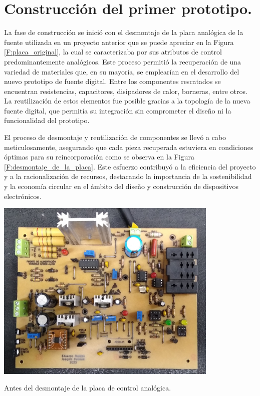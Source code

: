 \section{Construcción del primer prototipo.}
La fase de construcción se inició con el desmontaje de la placa analógica de la fuente utilizada en un proyecto anterior que se puede apreciar en la Figura \ref{F:placa_original}, la cual se caracterizaba por sus atributos de control predominantemente analógicos. Este proceso permitió la recuperación de una variedad de materiales que, en su mayoría, se emplearían en el desarrollo del nuevo prototipo de fuente digital. Entre los componentes rescatados se encuentran resistencias, capacitores, disipadores de calor, borneras, entre otros. La reutilización de estos elementos fue posible gracias a la topología de la nueva fuente digital, que permitía su integración sin comprometer el diseño ni la funcionalidad del prototipo.  \par 
El proceso de desmontaje y reutilización de componentes se llevó a cabo meticulosamente, asegurando que cada pieza recuperada estuviera en condiciones óptimas para su reincorporación como se observa en la Figura \ref{F:desmontaje_de_la_placa}. Este esfuerzo contribuyó a la eficiencia del proyecto y a la racionalización de recursos, destacando la importancia de la sostenibilidad y la economía circular en el ámbito del diseño y construcción de dispositivos electrónicos.\par
\begin{foto}[H]
    \centering
    \includegraphics[width=0.8\textwidth]{./imagenes/fotos/placa_original.jpg}
    \caption{Antes del desmontaje de la placa de control analógica.}
    \label{F:placa_original}
\end{foto}

